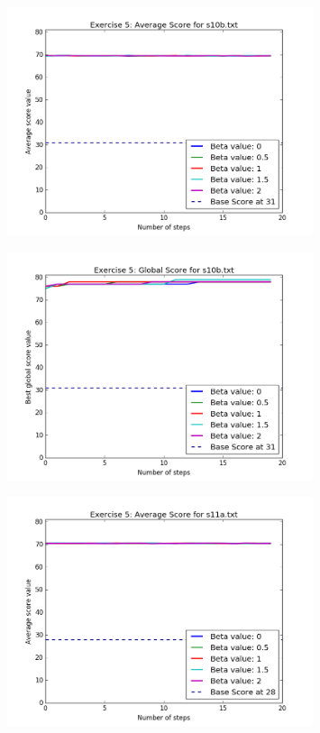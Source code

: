 \documentclass[a4paper]{article}
\begin{document}
\begin{enumerate}
\begin{enumerate}
    	    	\begin{figure}[H]
        	\centering
          	\includegraphics[width=0.8\textwidth]{images/average_s10b.png}
    	\end{figure}	
    	
    	\begin{figure}[H]
        	\centering
          	\includegraphics[width=0.8\textwidth]{images/best_s10b.png}
    	\end{figure}
    	
    	    	\begin{figure}[H]
        	\centering
          	\includegraphics[width=0.8\textwidth]{images/average_s11a.png}
    	\end{figure}	
    	

\end{enumerate}
\end{enumerate}
\end{document}
